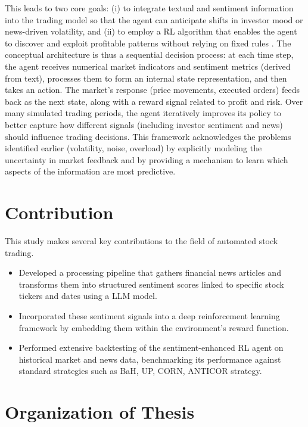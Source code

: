 This leads to two core goals: (i) to integrate textual and sentiment information into the trading model so that the agent can anticipate shifts in investor mood or news-driven volatility, and (ii) to employ a \gls{RL} algorithm that enables the agent to discover and exploit profitable patterns without relying on fixed rules \cite{Nevmyvaka2006}. The conceptual architecture is thus a sequential decision process: at each time step, the agent receives numerical market indicators and sentiment metrics (derived from text), processes them to form an internal state representation, and then takes an action. The market’s response (price movements, executed orders) feeds back as the next state, along with a reward signal related to profit and risk. Over many simulated trading periods, the agent iteratively improves its policy to better capture how different signals (including investor sentiment and news) should influence trading decisions. This framework acknowledges the problems identified earlier (volatility, noise, overload) by explicitly modeling the uncertainty in market feedback and by providing a mechanism to learn which aspects of the information are most predictive.

\section{Contribution}
\label{sec:contribution}
This study makes several key contributions to the field of automated stock trading.

\begin{itemize}
  \item Developed a processing pipeline that gathers financial news articles and transforms them into structured sentiment scores linked to specific stock tickers and dates using a \gls{LLM} model.
  \item Incorporated these sentiment signals into a deep reinforcement learning framework by embedding them within the environment’s reward function.
  \item Performed extensive backtesting of the sentiment-enhanced RL agent on historical market and news data, benchmarking its performance against standard strategies such as \gls{BaH}, \gls{UP}, \gls{CORN}, \gls{ANTICOR} strategy.
\end{itemize}

\section{Organization of Thesis}

